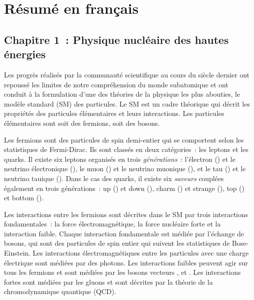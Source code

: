 \chapter{R{\'e}sum{\'e} en fran{\c{c}}ais}\label{app:Summary_French}


\section*{Chapitre 1{~:} Physique nucl{\'e}aire des hautes {\'e}nergies}

Les progr{\`e}s r{\'e}alis{\'e}s par la communaut{\'e} scientifique au cours du si{\`e}cle dernier ont repouss{\'e} les limites de notre compr{\'e}hension du monde subatomique et ont conduit {\`a} la formulation d'une des th{\'e}ories de la physique les plus abouties, le mod{\`e}le standard (SM) des particules. Le SM est un cadre th{\'e}orique qui d{\'e}crit les propri{\'e}t{\'e}s des particules {\'e}l{\'e}mentaires et leurs interactions. Les particules {\'e}l{\'e}mentaires sont soit des fermions, soit des bosons.

Les fermions sont des particules de spin demi-entier qui se comportent selon les statistiques de Fermi-Dirac. Ils sont class{\'e}s en deux cat{\'e}gories{~:} les leptons et les quarks. Il existe six leptons organis{\'e}s en trois \textit{g{\'e}n{\'e}rations}{~:} l'{\'e}lectron (\PGem) et le neutrino {\'e}lectronique (\PGnGe), le muon (\PGmm) et le neutrino muonique (\PGnGm), et le tau (\PGtm) et le neutrino tauique (\PGnGt). Dans le cas des quarks, il existe six \textit{saveurs} coupl{\'e}es {\'e}galement en trois g{\'e}n{\'e}rations{~:} up (\cPqu) et down (\cPqd), charm (\cPqc) et strange (\cPqs), top (\cPqt) et bottom (\cPqb).

Les interactions entre les fermions sont d{\'e}crites dans le SM par trois interactions fondamentales{~:} la force {\'e}lectromagn{\'e}tique, la force nucl{\'e}aire forte et la interaction faible. Chaque interaction fondamentale est m{\'e}di{\'e}e par l'{\'e}change de bosons, qui sont des particules de spin entier qui suivent les statistiques de Bose-Einstein. Les interactions {\'e}lectromagn{\'e}tiques entre les particules avec une charge {\'e}lectrique sont m{\'e}di{\'e}es par des photons. Les interactions faibles peuvent agir sur tous les fermions et sont m{\'e}di{\'e}es par les bosons vecteurs {\Wp}, {\Wm}  et {\PZ}. Les interactions fortes sont m{\'e}di{\'e}es par les gluons et sont d{\'e}crites par la th{\'e}orie de la chromodynamique quantique (QCD).

